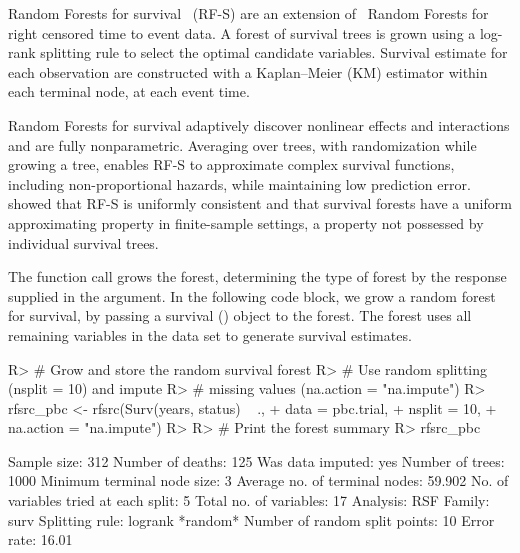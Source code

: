 \documentclass[nojss]{jss}\usepackage[]{graphicx}\usepackage[]{color}
\begin{document}
Random Forests for survival~\citep{Ishwaran:2007, Ishwaran:2008} (RF-S) are an extension of~\cite{Breiman:2001} Random Forests for right censored time to event data. A forest of survival trees is grown using a log-rank splitting rule to select the optimal candidate variables. Survival estimate for each observation are constructed with a Kaplan--Meier (KM) estimator within each terminal node, at each event time. 

Random Forests for survival adaptively discover nonlinear effects and interactions and are fully nonparametric. Averaging over trees, with randomization while growing a tree, enables RF-S to approximate complex survival functions, including non-proportional hazards, while maintaining low prediction error. \cite{Ishwaran:2010a} showed that RF-S is uniformly consistent and that survival forests have a uniform approximating property in finite-sample settings, a property not possessed by individual survival trees.

The   function call grows the forest, determining the type of forest by the response supplied in the  argument. In the following code block, we grow a random forest for survival, by passing a survival () object to the forest. The forest uses all remaining variables in the  data set to generate survival estimates. 

\begin{Schunk}
\begin{Sinput}
R> # Grow and store the random survival forest
R> # Use random splitting (nsplit = 10) and impute 
R> # missing values (na.action = "na.impute")
R> rfsrc_pbc <- rfsrc(Surv(years, status) ~ ., 
+                    data = pbc.trial, 
+                    nsplit = 10, 
+                    na.action = "na.impute")
R> 
R> # Print the forest summary
R> rfsrc_pbc
\end{Sinput}
\end{Schunk}

\begin{Schunk}
\begin{Soutput}
                         Sample size: 312
                    Number of deaths: 125
                    Was data imputed: yes
                     Number of trees: 1000
          Minimum terminal node size: 3
       Average no. of terminal nodes: 59.902
No. of variables tried at each split: 5
              Total no. of variables: 17
                            Analysis: RSF
                              Family: surv
                      Splitting rule: logrank *random*
       Number of random split points: 10
                          Error rate: 16.01%
\end{Soutput}
\end{Schunk}
\end{document}
